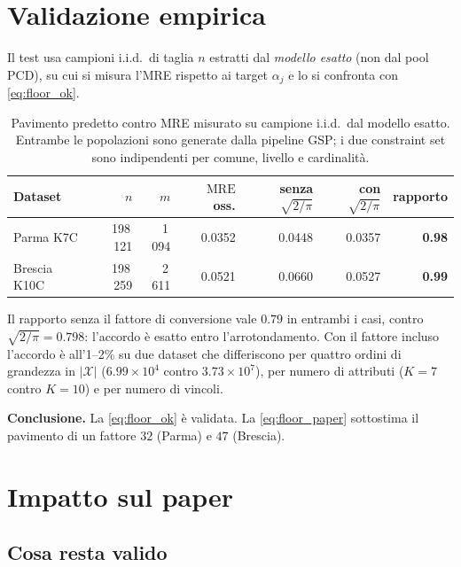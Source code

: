 \documentclass[11pt,a4paper]{article}
\newcommand{\MRE}{\mathrm{MRE}}
\begin{document}
\section{Validazione empirica}

Il test usa campioni i.i.d.\ di taglia $n$ estratti dal
\emph{modello esatto} (non dal pool PCD), su cui si misura l'MRE
rispetto ai target $\alpha_j$ e lo si confronta con
\eqref{eq:floor_ok}.

\begin{table}[h]
\centering
\caption{Pavimento predetto contro MRE misurato su campione i.i.d.\
dal modello esatto. Entrambe le popolazioni sono generate dalla
pipeline GSP; i due constraint set sono indipendenti per comune,
livello e cardinalità.}
\begin{tabular}{lrrrrrr}
\toprule
Dataset & $n$ & $m$ & $\MRE$ oss. & senza $\sqrt{2/\pi}$
        & con $\sqrt{2/\pi}$ & rapporto \\
\midrule
Parma K7C     & 198\,121 & 1\,094 & 0.0352 & 0.0448 & 0.0357 & \textbf{0.98} \\
Brescia K10C  & 198\,259 & 2\,611 & 0.0521 & 0.0660 & 0.0527 & \textbf{0.99} \\
\bottomrule
\end{tabular}
\label{tab:validation}
\end{table}

Il rapporto senza il fattore di conversione vale $0.79$ in entrambi i
casi, contro $\sqrt{2/\pi}=0.798$: l'accordo è esatto entro
l'arrotondamento. Con il fattore incluso l'accordo è all'1--2\% su due
dataset che differiscono per quattro ordini di grandezza in $|\mathcal{X}|$
($6.99\times10^4$ contro $3.73\times10^7$), per numero di attributi
($K{=}7$ contro $K{=}10$) e per numero di vincoli.

\medskip
\noindent
\textbf{Conclusione.} La \eqref{eq:floor_ok} è validata. La
\eqref{eq:floor_paper} sottostima il pavimento di un fattore $32$
(Parma) e $47$ (Brescia).

\section{Impatto sul paper}

\subsection{Cosa resta valido}
\end{document}
